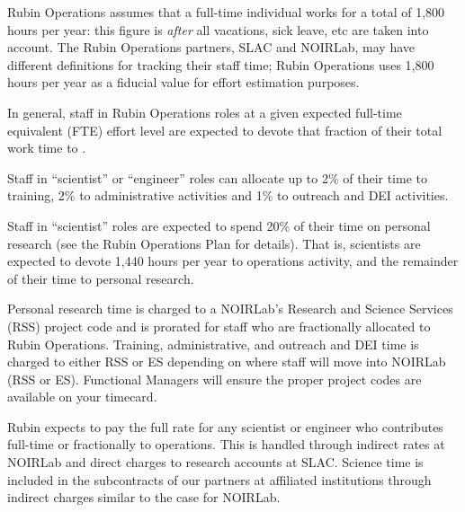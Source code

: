 Rubin \gls{Operations} assumes that a full-time individual works for a total of 1,800 hours per year: this figure is \emph{after} all vacations, sick leave, etc are taken into account.
The \gls{Rubin Operations} partners, \gls{SLAC} and \gls{NOIRLab}, may have different definitions for tracking their staff time; \gls{Rubin Operations} uses 1,800 hours per year as a fiducial value for effort estimation purposes.

In general, staff in \gls{Rubin Operations} roles at a given expected full-time equivalent (\gls{FTE}) effort level are expected to devote that fraction of their total work time to \RO.

Staff in ``scientist'' or ``engineer'' roles can allocate up to 2\% of their time to training, 2\% to administrative activities and 1\% to outreach and \gls{DEI} activities.

Staff in ``scientist'' roles are expected to spend 20\% of their time on personal research (see the \gls{Rubin Operations} Plan for details).
That is, scientists are expected to devote 1,440 hours per year to operations activity, and the remainder of their time to personal research.

Personal research time is charged to a \gls{NOIRLab}'s Research and Science Services (\gls{RSS}) project code and is prorated for staff who are fractionally allocated to \gls{Rubin Operations}.
Training, administrative, and outreach and \gls{DEI} time is charged to either RSS or \gls{ES} depending on where staff will move into \gls{NOIRLab} (RSS or \gls{ES}).
Functional Managers will ensure the proper project codes are available on your timecard.

Rubin expects to pay the full rate for any scientist or engineer who contributes full-time or fractionally to operations.
This is handled through indirect rates at \gls{NOIRLab} and direct charges to research accounts at \gls{SLAC}.
Science time is included in the subcontracts of our partners at affiliated institutions through indirect charges similar to the case for \gls{NOIRLab}.

